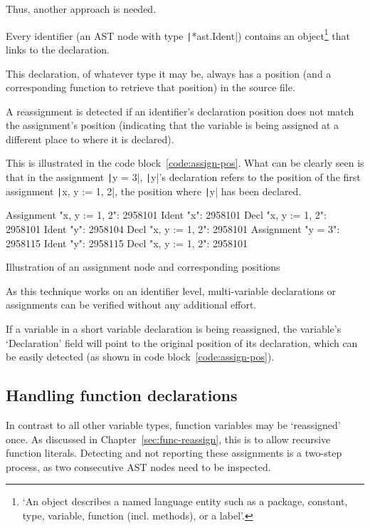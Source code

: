 Thus, another approach is needed.

Every identifier (an AST node with type \texttt|*ast.Ident|) contains an object\footnote{`An
    object describes a named language entity such as a package, constant, type, variable,
function (incl. methods), or a label'\autocite{go-ast-object}.} that links to the declaration.

This declaration, of whatever type it may be, always has a position (and a corresponding function
to retrieve that position) in the source file.

A reassignment is detected if an identifier's declaration position does not match the assignment's
position (indicating that the variable is being assigned at a different place to where it is
declared).

This is illustrated in the code block~\ref{code:assign-pos}. What can be clearly seen is that in
the assignment \texttt|y = 3|, \texttt|y|'s declaration refers to the position
of the first assignment \texttt|x, y := 1, 2|, the position where \texttt|y| has
been declared.
\begin{listing}
    \begin{gocode}
Assignment "x, y := 1, 2": 2958101
        Ident "x": 2958101
                Decl "x, y := 1, 2": 2958101
        Ident "y": 2958104
                Decl "x, y := 1, 2": 2958101
Assignment "y = 3": 2958115
        Ident "y": 2958115
                Decl "x, y := 1, 2": 2958101
    \end{gocode}
\caption{Illustration of an assignment node and corresponding positions\autocite{ast-positions}\label{code:assign-pos}}
\end{listing}

As this technique works on an identifier level, multi-variable declarations or assignments
can be verified without any additional effort.

If a variable in a short variable declaration is being reassigned, the variable's `Declaration'
field will point to the original position of its declaration, which can be easily detected
(as shown in code block~\ref{code:assign-pos}).

\subsection{Handling function declarations}

In contrast to all other variable types, function variables may be `reassigned' once.
As discussed in Chapter~\ref{sec:func-reassign}, this is to allow recursive function
literals. Detecting and not reporting these assignments is a two-step process, as two
consecutive AST nodes need to be inspected.

